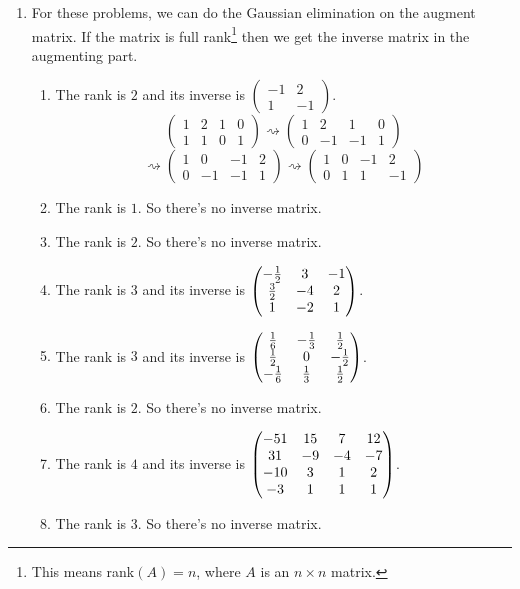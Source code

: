 \begin{enumerate}
\begin{enumerate}
\end{enumerate}
\item For these problems, we can do the Gaussian elimination on the augment matrix. If the matrix is full rank\footnote{This means rank$(A)=n$, where $A$ is an $n\times n$ matrix.} then we get the inverse matrix in the augmenting part.\begin{enumerate}
\item The rank is $2$ and its inverse is $\left(\begin{array}{cc}-1&2\\1&-1\end{array}\right)$.
\[\left(\begin{array}{cc|cc}1&2&1&0\\1&1&0&1\end{array}\right)\rightsquigarrow \left(\begin{array}{cc|cc}1&2&1&0\\0&-1&-1&1\end{array}\right)\]
\[\rightsquigarrow \left(\begin{array}{cc|cc}1&0&-1&2\\0&-1&-1&1\end{array}\right)\rightsquigarrow \left(\begin{array}{cc|cc}1&0&-1&2\\0&1&1&-1\end{array}\right)\]
\item The rank is $1$. So there's no inverse matrix.
\item The rank is $2$. So there's no inverse matrix.
\item The rank is $3$ and its inverse is $\begin{pmatrix}-\frac{1}{2} & 3 & -1\cr \frac{3}{2} & -4 & 2\cr 1 & -2 & 1\end{pmatrix}$.
\item The rank is $3$ and its inverse is $\begin{pmatrix}\frac{1}{6} & -\frac{1}{3} & \frac{1}{2}\cr \frac{1}{2} & 0 & -\frac{1}{2}\cr -\frac{1}{6} & \frac{1}{3} & \frac{1}{2}\end{pmatrix}$.
\item The rank is $2$. So there's no inverse matrix.
\item The rank is $4$ and its inverse is $\begin{pmatrix}-51 & 15 & 7 & 12\cr 31 & -9 & -4 & -7\cr -10 & 3 & 1 & 2\cr -3 & 1 & 1 & 1\end{pmatrix}$.
\item The rank is $3$. So there's no inverse matrix.

\end{enumerate}
\end{enumerate}
